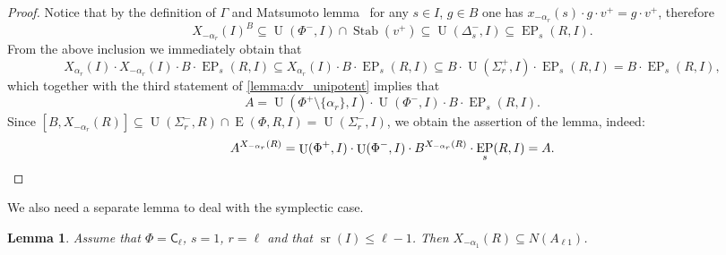 \documentclass[11pt]{amsart}
\theoremstyle{plain}
\numberwithin{equation}{section}
\newtheorem{lemma}{Lemma}
\numberwithin{lemma}{section}
\theoremstyle{definition}
\theoremstyle{remark}
\DeclareMathOperator{\E}{E}
\DeclareMathOperator{\EP}{EP}
\DeclareMathOperator{\U}{U}
\DeclareMathOperator{\sr}{sr}
\DeclareMathOperator{\Stab}{Stab}
\newcommand{\rC}{\mathsf{C}}
\begin{document}
\begin{proof}
Notice that by the definition of $\Gamma$ and Matsumoto lemma~\cite[Lemma~2.3]{Ma69} for any $s\in I$, $ g\in B$ one has $x_{-\alpha_r}(s) \cdot g \cdot v^+ = g \cdot v^+$, therefore
\[ X_{-\alpha_{r}}(I)^{B} \subseteq \U(\Phi^-, I) \cap \Stab(v^+) \subseteq \U(\Delta_s^-, I) \subseteq \EP_s(R, I). \]
From the above inclusion we immediately obtain that
\begin{equation*} X_{\alpha_r}(I) \cdot X_{-\alpha_r}(I) \cdot B \cdot \EP_s(R, I) \subseteq X_{\alpha_r}(I) \cdot B \cdot \EP_s(R, I) \subseteq B \cdot \U(\Sigma_r^+, I) \cdot \EP_s(R, I) = B \cdot \EP_s(R, I), \end{equation*}
which together with the third statement of \cref{lemma:dv_unipotent} implies that
\begin{equation*} \label{rel:sred}
A = \U(\Phi^+\setminus\{\alpha_r\}, I) \cdot \U(\Phi^-, I) \cdot B \cdot \EP_s(R, I).
\end{equation*}
Since $[B, X_{-\alpha_r}(R)] \subseteq \U(\Sigma_r^-, R) \cap \E(\Phi, R, I) = \U(\Sigma_r^-, I)$, we obtain the assertion of the lemma, indeed:
\begin{equation*} \label{rel:ninv} A^{X_{-\alpha_{r}}(R)} = \U(\Phi^+, I) \cdot \U(\Phi^-, I) \cdot B ^{X_{-\alpha_{r}}(R)} \cdot \EP_s(R, I) = A. \qedhere \end{equation*}
\end{proof}
We also need a separate lemma to deal with the symplectic case.
\begin{lemma}\label{lemma:DVST}
Assume that $\Phi=\rC_\ell$, $s=1$, $r=\ell$ and that $\sr(I) \leq \ell-1$. Then $X_{-\alpha_1}(R) \subseteq N(A_{\ell 1})$.
\end{lemma}
\end{document}
